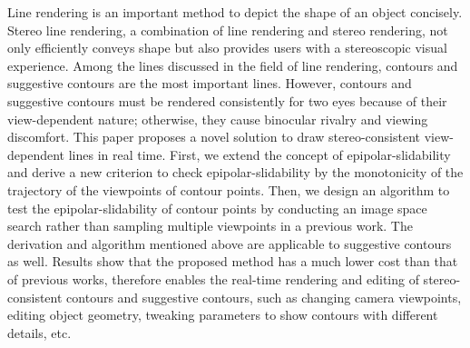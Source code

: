 \begin{englishabstract}

Line rendering is an important method to depict the shape of an object concisely. Stereo line rendering, a combination of line rendering and stereo rendering, not only efficiently conveys shape but also provides users with a stereoscopic visual experience. Among the lines discussed in the field of line rendering, contours and suggestive contours are the most important lines. However, contours and suggestive contours must be rendered consistently for two eyes because of their view-dependent nature; otherwise, they cause binocular rivalry and viewing discomfort. This paper proposes a novel solution to draw stereo-consistent view-dependent lines in real time. First, we extend the concept of epipolar-slidability and derive a new criterion to check epipolar-slidability by the monotonicity of the trajectory of the viewpoints of contour points. Then, we design an algorithm to test the epipolar-slidability of contour points by conducting an image space search rather than sampling multiple viewpoints in a previous work. The derivation and algorithm mentioned above are applicable to suggestive contours as well. Results show that the proposed method has a much lower cost than that of previous works, therefore enables the real-time rendering and editing of stereo-consistent contours and suggestive contours, such as changing camera viewpoints, editing object geometry, tweaking parameters to show contours with different details, etc.


\end{englishabstract}

